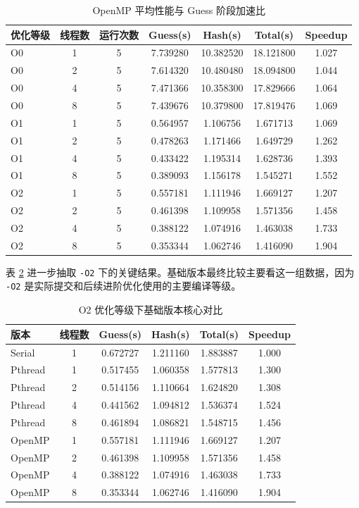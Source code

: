 \documentclass[UTF8,a4paper,12pt]{ctexart}
\begin{document}
\begin{table}[htbp]
  \centering
  \caption{OpenMP 平均性能与 Guess 阶段加速比}
  \label{tab:omp}
  \small
  \begin{tabular}{lcccccc}
    \toprule
    优化等级 & 线程数 & 运行次数 & Guess(s) & Hash(s) & Total(s) & Speedup \\
    \midrule
    O0 & 1 & 5 & 7.739280 & 10.382520 & 18.121800 & 1.027 \\
    O0 & 2 & 5 & 7.614320 & 10.480480 & 18.094800 & 1.044 \\
    O0 & 4 & 5 & 7.471366 & 10.358300 & 17.829666 & 1.064 \\
    O0 & 8 & 5 & 7.439676 & 10.379800 & 17.819476 & 1.069 \\
    O1 & 1 & 5 & 0.564957 & 1.106756 & 1.671713 & 1.069 \\
    O1 & 2 & 5 & 0.478263 & 1.171466 & 1.649729 & 1.262 \\
    O1 & 4 & 5 & 0.433422 & 1.195314 & 1.628736 & 1.393 \\
    O1 & 8 & 5 & 0.389093 & 1.156178 & 1.545271 & 1.552 \\
    O2 & 1 & 5 & 0.557181 & 1.111946 & 1.669127 & 1.207 \\
    O2 & 2 & 5 & 0.461398 & 1.109958 & 1.571356 & 1.458 \\
    O2 & 4 & 5 & 0.388122 & 1.074916 & 1.463038 & 1.733 \\
    O2 & 8 & 5 & 0.353344 & 1.062746 & 1.416090 & 1.904 \\
    \bottomrule
  \end{tabular}
\end{table}

表 \ref{tab:o2-compare} 进一步抽取 \texttt{-O2} 下的关键结果。基础版本最终比较主要看这一组数据，因为 \texttt{-O2} 是实际提交和后续进阶优化使用的主要编译等级。

\begin{table}[htbp]
  \centering
  \caption{O2 优化等级下基础版本核心对比}
  \label{tab:o2-compare}
  \begin{tabular}{lccccc}
    \toprule
    版本 & 线程数 & Guess(s) & Hash(s) & Total(s) & Speedup \\
    \midrule
    Serial & 1 & 0.672727 & 1.211160 & 1.883887 & 1.000 \\
    Pthread & 1 & 0.517455 & 1.060358 & 1.577813 & 1.300 \\
    Pthread & 2 & 0.514156 & 1.110664 & 1.624820 & 1.308 \\
    Pthread & 4 & 0.441562 & 1.094812 & 1.536374 & 1.524 \\
    Pthread & 8 & 0.461894 & 1.086821 & 1.548715 & 1.456 \\
    OpenMP & 1 & 0.557181 & 1.111946 & 1.669127 & 1.207 \\
    OpenMP & 2 & 0.461398 & 1.109958 & 1.571356 & 1.458 \\
    OpenMP & 4 & 0.388122 & 1.074916 & 1.463038 & 1.733 \\
    OpenMP & 8 & 0.353344 & 1.062746 & 1.416090 & 1.904 \\
    \bottomrule
  \end{tabular}
\end{table}
\end{document}
